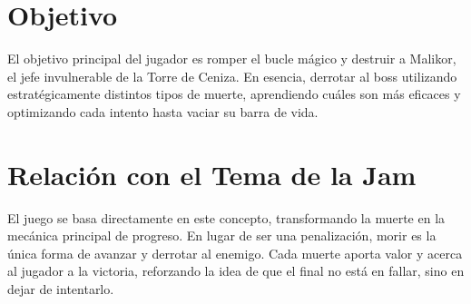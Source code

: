 \documentclass[11pt,a4paper]{article}
\begin{document}
\section*{Objetivo}
El objetivo principal del jugador es romper el bucle mágico y destruir a Malikor, el jefe invulnerable de la Torre de Ceniza. En esencia, derrotar al boss utilizando estratégicamente distintos tipos de muerte, aprendiendo cuáles son más eficaces y optimizando cada intento hasta vaciar su barra de vida.

\section*{Relación con el Tema de la Jam}
El juego se basa directamente en este concepto, transformando la muerte en la mecánica principal de progreso. En lugar de ser una penalización, morir es la única forma de avanzar y derrotar al enemigo. Cada muerte aporta valor y acerca al jugador a la victoria, reforzando la idea de que el final no está en fallar, sino en dejar de intentarlo.
\end{document}
